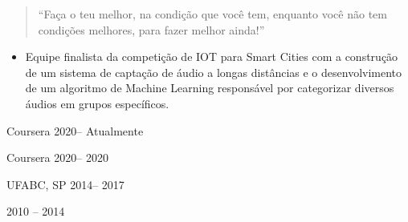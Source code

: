 
\begin{quote}
``Faça o teu melhor, na condição que você tem, enquanto você não tem condições melhores, 
  para fazer melhor ainda!''
\end{quote}

\begin{itemize}
  \item Equipe finalista da competição de IOT para Smart Cities com a construção de 
  um sistema de captação de áudio a longas distâncias e o desenvolvimento de um algoritmo 
  de Machine Learning responsável por categorizar diversos áudios em grupos específicos.
  


\end{itemize}



 {Coursera} {2020-- Atualmente}{} 

 {Coursera} {2020-- 2020}{} 

 {UFABC, SP} {2014-- 2017}{} 

 {2010 -- 2014}{}


